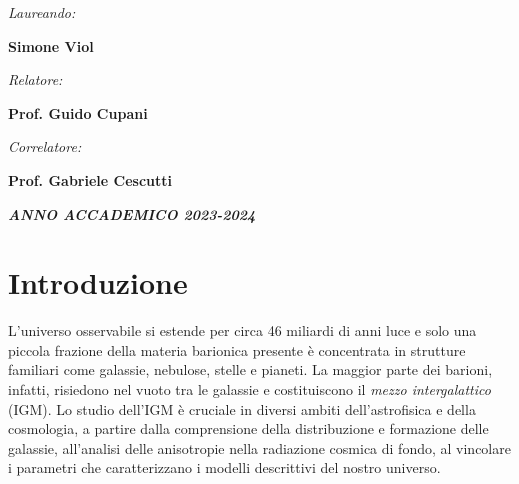 \documentclass[a4paper,12pt]{article}
\begin{document}
\begin{minipage}[t]{0.43\textwidth}
\begin{flushleft}


\large{\emph{Laureando:}}

\large{\textbf {Simone Viol}} 

\end{flushleft}
\end{minipage}
\begin{minipage}[t]{0.5\textwidth}
\begin{flushright}
\large{\emph{Relatore:}}

\large{\textbf {Prof. Guido Cupani}} 

\vspace{.5cm}

\large{\emph{Correlatore:}}

\large{\textbf{Prof. Gabriele Cescutti}}

\end{flushright}
\end{minipage}

\vspace{2cm}

\begin{center}
    \emph{\textbf{ANNO ACCADEMICO 2023-2024}}
\end{center}

\restoregeometry


\tableofcontents

\newpage

\section{Introduzione} 
L'universo osservabile si estende per circa 46 miliardi di anni luce e solo una piccola frazione della materia barionica presente è concentrata in strutture familiari come galassie, nebulose, stelle e pianeti. La maggior parte dei barioni, infatti, risiedono nel vuoto tra le galassie e costituiscono il \textit{mezzo intergalattico} (IGM). Lo studio dell'IGM è cruciale in diversi ambiti dell'astrofisica e della cosmologia, a partire dalla comprensione della distribuzione e  formazione delle galassie, all'analisi delle anisotropie nella radiazione cosmica di fondo, al vincolare i parametri che caratterizzano i modelli descrittivi del nostro universo. 
\end{document}
